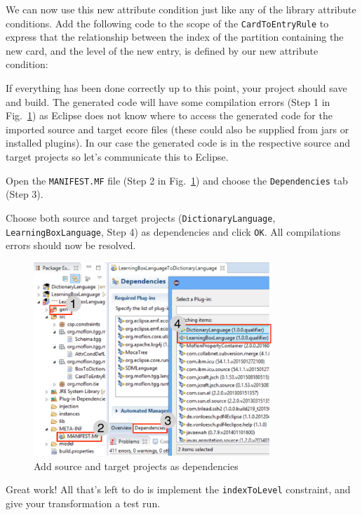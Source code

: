 \begin{stepbystep}
\item We can now use this new attribute condition  just like any of the library attribute conditions.
Add the following code to the  scope of the \texttt{CardToEntryRule} to express that the relationship between the index of the partition containing the new card, and the level of the new entry, is defined by our new attribute condition:

\end{stepbystep}

If everything has been done correctly up to this point, your project should save and build.
The generated code will have some compilation errors (Step 1 in Fig.~\ref{eclipse:tggGenerated}) as Eclipse does not know where to access the generated code for the imported source and target ecore files (these could also be supplied from jars or installed plugins).
In our case the generated code is in the respective source and target projects so let's communicate this to Eclipse.

\begin{stepbystep}

\item Open the \texttt{MANIFEST.MF} file (Step 2 in Fig.~\ref{eclipse:tggGenerated}) and choose the \texttt{De\-pen\-den\-cies} tab (Step 3).

\item Choose both source and target projects (\texttt{DictionaryLanguage}, \texttt{Learning\-Box\-Language}, Step 4) as dependencies and click \texttt{OK}.
All compilations errors should now be resolved.
\end{stepbystep}

\begin{figure}[htb]
\begin{center}
  \includegraphics[width=0.8\textwidth]{eclipse_generatedTGG}
  \caption{Add source and target projects as dependencies}
  \label{eclipse:tggGenerated}
\end{center}
\end{figure}

Great work! All that's left to do is implement the \texttt{indexToLevel} constraint, and give your transformation a test run.

